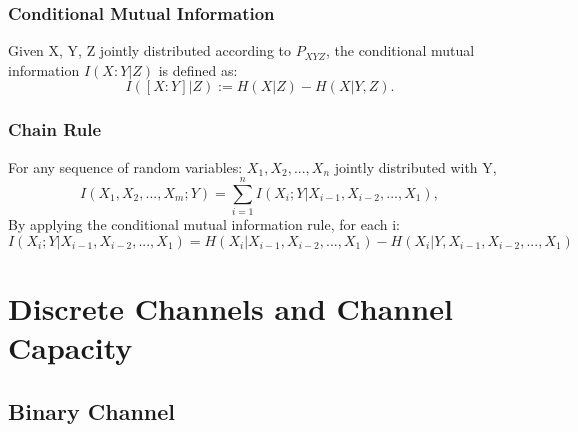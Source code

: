 \documentclass[12pt]{article}
\begin{document}
\subsubsection{Conditional Mutual Information}
Given X, Y, Z jointly distributed according to $P_{XYZ}$, the conditional mutual information $I(X:Y|Z)$ is defined as:
\[
I([X:Y]|Z):= H(X|Z) - H(X|Y,Z).
\]
\subsubsection{Chain Rule}
For any sequence of random variables: $X_1,X_2,...,X_n$ jointly distributed with Y,
\[
I(X_1,X_2,...,X_m;Y) = \sum_{i=1}^n I(X_i;Y|X_{i-1},X_{i-2},...,X_1),
\]
By applying the conditional mutual information rule, for each i:
\[
I(X_i;Y|X_{i-1},X_{i-2},...,X_1) = H(X_i|X_{i-1},X_{i-2},...,X_1) -  H(X_i|Y,X_{i-1},X_{i-2},...,X_1)
\]

\section{Discrete Channels and Channel Capacity}

\subsection{Binary Channel}
\end{document}
